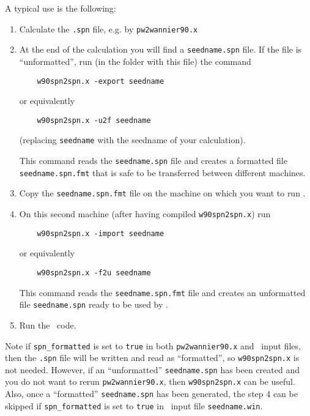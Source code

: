 A typical use is the following:
\begin{enumerate}
	\item Calculate the \verb|.spn| file, e.g. by \texttt{pw2wannier90.x}
	\item At the end of the calculation you will find a \verb|seedname.spn|
	file. If the file is ``unformatted'', run (in the folder with this file) the command
	\begin{verbatim}
	w90spn2spn.x -export seedname
	\end{verbatim}
	or equivalently
	\begin{verbatim}
	w90spn2spn.x -u2f seedname
	\end{verbatim}
	(replacing \verb|seedname| with the seedname of your calculation).

	This command reads the \verb|seedname.spn| file and creates a
	formatted file  \verb|seedname.spn.fmt| that is safe to be transferred
	between different machines.
	\item Copy the \verb|seedname.spn.fmt| file on the machine on
	which you want to run \postw.
	\item On this second machine (after having compiled
	\verb|w90spn2spn.x|) run
	\begin{verbatim}
	w90spn2spn.x -import seedname
	\end{verbatim}
	or equivalently
	\begin{verbatim}
	w90spn2spn.x -f2u seedname
	\end{verbatim}

	This command reads the \verb|seedname.spn.fmt| file and creates an
	unformatted file \verb|seedname.spn| ready to be used by \postw.

	\item Run the \postw\ code.

\end{enumerate}

Note if \texttt{spn\_formatted} is set to \texttt{true} in both
\texttt{pw2wannier90.x} and \postw\ input files, then the \verb|.spn| file will
be written and read as ``formatted'', so \texttt{w90spn2spn.x} is not needed.
However, if an ``unformatted'' \verb|seedname.spn| has been created and
you do not want to rerun \texttt{pw2wannier90.x}, then
\texttt{w90spn2spn.x} can be useful.
Also, once a ``formatted'' \verb|seedname.spn| has been generated, the step 4 can be skipped if
\texttt{spn\_formatted} is set to \texttt{true} in \postw\ input file \verb|seedname.win|.
